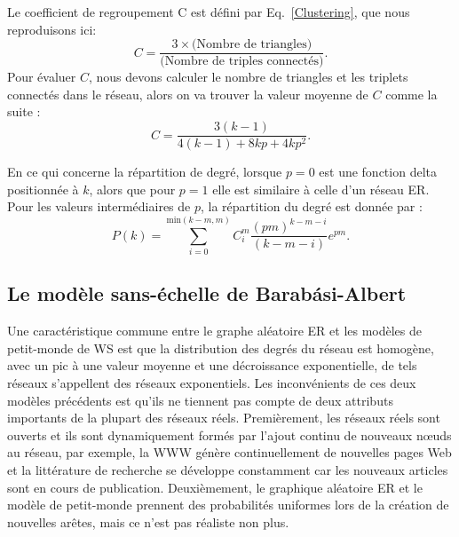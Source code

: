    Le coefficient de regroupement C est défini par Eq.~\eqref{Clustering}, que nous reproduisons ici:
 \begin{equation}
 C=\frac{3\times\text{(Nombre de triangles)}}{\text{(Nombre de triples connectés)}}.
 \end{equation}  
Pour évaluer $C$, nous devons calculer le nombre de triangles et les triplets connectés dans le réseau, alors on va trouver la valeur moyenne de $C$ comme la suite \cite{Newman2010-558}:
\begin{equation}
C=\frac{3(k-1)}{4(k-1)+8kp+4kp^2}.
\end{equation}  

En ce qui concerne la répartition de degré, lorsque $p=0$ est une fonction delta positionnée à $k$, alors que pour $p=1$ elle est similaire à celle d'un réseau ER. Pour les valeurs intermédiaires de $p$, la répartition du degré est donnée par \cite{Barrat-Weigt2000}:
\begin{equation}
P(k)=\sum_{i=0}^{\text{min}(k-m,m)}C_i^m\frac{(pm)^{k-m-i}}{(k-m-i)}e^{pm}.
\end{equation} 

   \subsection{Le modèle sans-échelle de Barabási-Albert}
   
Une caractéristique commune entre le graphe aléatoire ER et les modèles de petit-monde de WS est que la distribution des degrés du réseau est homogène, avec un pic à une valeur moyenne et une décroissance exponentielle, de tels réseaux s'appellent des réseaux exponentiels. Les inconvénients de ces deux modèles précédents est qu'ils ne tiennent pas compte de deux attributs importants de la plupart des réseaux réels.  Premièrement, les réseaux réels sont ouverts et ils sont dynamiquement formés par l'ajout continu de nouveaux nœuds au réseau, par exemple, la WWW génère continuellement de nouvelles pages Web et la littérature de recherche se développe constamment car les nouveaux articles sont en cours de publication. Deuxièmement, le graphique aléatoire ER et le modèle de petit-monde prennent des probabilités uniformes lors de la création de nouvelles arêtes, mais ce n'est pas réaliste non plus.

